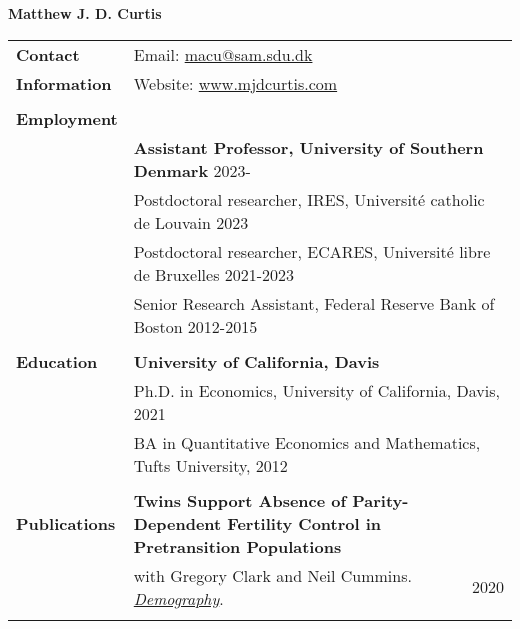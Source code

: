 \documentclass[a4paper,11pt,oneside]{article}
\begin{document}

\noindent  \LARGE{\textbf{Matthew J. D. Curtis}}  \\

\normalsize




\noindent \begin{longtable}{@{} p{0.175\linewidth} p{0.775\linewidth} p{0.05\linewidth}}
   
   
   
   \textbf{\large{Contact}}    &  \multicolumn{2}{l}{Email: \href{mailto:macu@sam.sdu.dk}{macu@sam.sdu.dk} }\\
   \textbf{\large{Information}}  &  \multicolumn{2}{l}{Website: \href{https://www.mjdcurtis.com/}{www.mjdcurtis.com} }\\
   \\ 
   
   \textbf{\large{Employment}}   \\
   &  \multicolumn{2}{l}{  \textbf{Assistant Professor, University of Southern Denmark} \hfill  2023-}\\
   &  \multicolumn{2}{l}{ Postdoctoral researcher, IRES, Universit\'{e} catholic de Louvain \hfill  2023}\\
   &  \multicolumn{2}{l}{ Postdoctoral researcher, ECARES, Universit\'{e} libre de Bruxelles \hfill  2021-2023}\\
   &  \multicolumn{2}{l}{ Senior Research Assistant, Federal Reserve Bank of Boston \hfill  2012-2015}\\
   \\
   \textbf{\large{Education}}    & \multicolumn{2}{l}{\textbf{University of California, Davis}} \\
   &  \multicolumn{2}{l}{Ph.D. in Economics, University of California, Davis, 2021}\\
   &  \multicolumn{2}{l}{BA in Quantitative Economics and Mathematics, Tufts University, 2012}\\
   \\
   
   \textbf{\large{Publications}}   & \textbf{Twins Support Absence of Parity-Dependent Fertility Control in Pretransition Populations }\\
   &  with Gregory Clark and Neil Cummins. \href{https://read.dukeupress.edu/demography/article/57/4/1571/168109/Twins-Support-the-Absence-of-Parity-Dependent}{\emph{Demography}}. & \hfill 2020\\
   \\  
   

\end{longtable}
\end{document}
